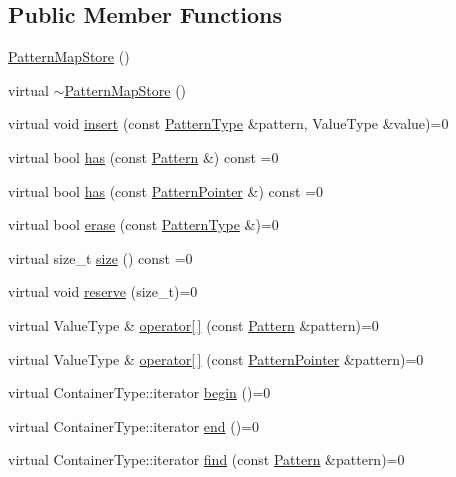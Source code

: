 \subsection*{Public Member Functions}
\begin{DoxyCompactItemize}
\item 
\hyperlink{classPatternMapStore_abb67cbdb113f2a2d6667e527bfd91668}{Pattern\+Map\+Store} ()
\item 
virtual \hyperlink{classPatternMapStore_a8ec3e63216173eed7fd733749e84d2bd}{$\sim$\+Pattern\+Map\+Store} ()
\item 
virtual void \hyperlink{classPatternMapStore_a4700a0f0dda681e6a4aa5e43ee917ad8}{insert} (const \hyperlink{pattern_8h_a351dc5aa88481a949638aeb6cc5e6754}{Pattern\+Type} \&pattern, Value\+Type \&value)=0
\item 
virtual bool \hyperlink{classPatternMapStore_a208cf2d90725a3a9291d2dae67ac9256}{has} (const \hyperlink{classPattern}{Pattern} \&) const  =0
\item 
virtual bool \hyperlink{classPatternMapStore_a4bce03112ff9c3c0950f31ccee0c9ab8}{has} (const \hyperlink{classPatternPointer}{Pattern\+Pointer} \&) const  =0
\item 
virtual bool \hyperlink{classPatternMapStore_a1cd3996a4d1067783adb0ce4100d5f38}{erase} (const \hyperlink{pattern_8h_a351dc5aa88481a949638aeb6cc5e6754}{Pattern\+Type} \&)=0
\item 
virtual size\+\_\+t \hyperlink{classPatternMapStore_af7bd333e776a4e55af9add5ee320dbb5}{size} () const  =0
\item 
virtual void \hyperlink{classPatternMapStore_a553c8b3c88c099e9c43ae8aa1194a741}{reserve} (size\+\_\+t)=0
\item 
virtual Value\+Type \& \hyperlink{classPatternMapStore_a43e79c4c7686d7b9822dbc0f29d26a4e}{operator\mbox{[}$\,$\mbox{]}} (const \hyperlink{classPattern}{Pattern} \&pattern)=0
\item 
virtual Value\+Type \& \hyperlink{classPatternMapStore_a808c1401e644c1663bcef477bad71cab}{operator\mbox{[}$\,$\mbox{]}} (const \hyperlink{classPatternPointer}{Pattern\+Pointer} \&pattern)=0
\item 
virtual Container\+Type\+::iterator \hyperlink{classPatternMapStore_a34918a8855a815fcfda852888e7639bc}{begin} ()=0
\item 
virtual Container\+Type\+::iterator \hyperlink{classPatternMapStore_a81b765692da54406e3951e1e1ae84fa5}{end} ()=0
\item 
virtual Container\+Type\+::iterator \hyperlink{classPatternMapStore_abe0af4c950b2389e5ec7c4d5bfb759c7}{find} (const \hyperlink{classPattern}{Pattern} \&pattern)=0

\end{DoxyCompactItemize}
